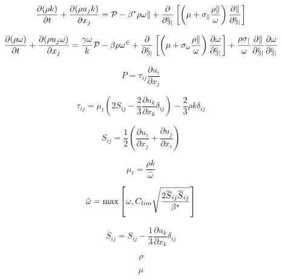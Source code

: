 

\begin{equation}
\frac{\partial (\rho k)}{\partial t} + \frac{\partial (\rho u_j k)}{\partial x_j}
  = \cal P - \beta^* \rho \omega k  + \frac{\partial}{\partial x_j}
  \left[\left(\mu + \sigma_k \frac{\rho k}{\omega} \right)\frac{\partial k}{\partial x_j}\right]
\end{equation}

\begin{equation}
\frac{\partial (\rho \omega)}{\partial t} + \frac{\partial (\rho u_j \omega)}{\partial x_j}
  = \frac{\gamma \omega}{k} \cal P -
  \beta \rho \omega^2 + \frac{\partial}{\partial x_j}
  \left[ \left( \mu + \sigma_{\omega} \frac{\rho k}{\omega} \right)
  \frac{\partial \omega}{\partial x_j} \right] +
  \frac{\rho \sigma_d}{\omega} \frac{\partial k}{\partial x_j}
  \frac{\partial \omega}{\partial x_j}
\end{equation}

\begin{equation}
P = \tau_{ij} \frac{\partial u_i}{\partial x_j}
\end{equation}

\begin{equation}
\tau_{ij} = \mu_t \left(2S_{ij} - \frac{2}{3} \frac{\partial u_k}{\partial x_k} \delta_{ij} \right)
   - \frac{2}{3} \rho k \delta_{ij}
\end{equation}

\begin{equation}
S_{ij} = \frac{1}{2} \left( \frac{\partial u_i}{\partial x_j} + \frac{\partial u_j}{\partial x_i} \right)
\end{equation}

\begin{equation}
\mu_t = \frac{\rho k}{\hat \omega}
\end{equation}

\begin{equation}
\hat \omega = {\rm max} \left[ \omega, C_{lim} 
\sqrt{\frac{2 \overline S_{ij} \overline S_{ij}}{\beta^*}} \right]
\end{equation}

\begin{equation}
\overline S_{ij} = S_{ij} - \frac{1}{3} \frac{\partial u_k}{\partial x_k} \delta_{ij}
\end{equation}

\begin{equation}
\rho
\end{equation}

\begin{equation}
\mu
\end{equation}

